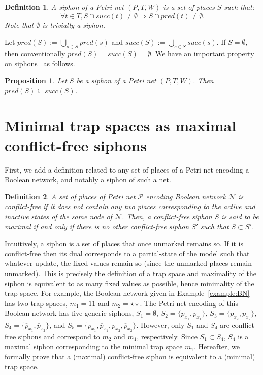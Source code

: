 \documentclass[preprint,12pt]{elsarticle}
\newtheorem{definition}{Definition}[section]
\newtheorem{proposition}{Proposition}[section]
\begin{document}
\begin{definition}

  A \emph{siphon} of a Petri net \((P, T, W)\) is a set of places \(S\) such that:
  \[\forall t\in T, S\cap succ(t)\not =\emptyset\Rightarrow S\cap pred(t)\not =\emptyset.\]
  Note that \(\emptyset\) is trivially a siphon.

\end{definition}

Let \(pred(S) := \bigcup_{s \in S}pred(s)\) and \(succ(S) := \bigcup_{s \in S}succ(s)\).
If \(S = \emptyset\), then conventionally \(pred(S) = succ(S) = \emptyset\).
We have an important property on siphons~\cite{DBLP:journals/isci/LiuB16} as follows.

\begin{proposition}
\label{prop:siphon_set}
  Let \(S\) be a siphon of a Petri net \((P, T, W)\).
  Then \(pred(S) \subseteq succ(S)\).

\end{proposition}


\section{Minimal trap spaces as maximal conflict-free siphons}
\label{sec:Main_finding}

First, we add a definition related to any set of places of a Petri net encoding a Boolean network, and notably a siphon of such a net.

\begin{definition}

  A set of places of Petri net \(\mathcal{P}\) encoding Boolean network \(\mathcal{N}\) is \emph{conflict-free} if it does not contain any two places corresponding to the active and inactive states of the same \emph{node} of \(\mathcal{N}\).
  Then, a conflict-free siphon \(S\) is said to be \emph{maximal} if and only if there is no other conflict-free siphon \(S'\) such that \(S \subset S'\).

\end{definition}

Intuitively, a siphon is a set of places that once unmarked remains so.
If it is conflict-free then its dual corresponds to a partial-state of the model such that whatever update, the fixed values remain so (since the unmarked places remain unmarked).
This is precisely the definition of a trap space and maximality of the siphon is equivalent to as many fixed values as possible, hence minimality of the trap space.
For example, the Boolean network given in Example~\ref{example:BN} has two trap spaces, \(m_1 = 11\) and \(m_2 = \star\star\).
The Petri net encoding of this Boolean network has five generic siphons, \(S_1 = \emptyset\), \(S_2 = \{p_{x_1}, \overline{p}_{x_1}\}\), \(S_3 = \{p_{x_2}, \overline{p}_{x_2}\}\), \(S_4 = \{\overline{p}_{x_1}, \overline{p}_{x_2}\}\), and \(S_5 = \{p_{x_1}, \overline{p}_{x_1}, p_{x_2}, \overline{p}_{x_2}\}\).
However, only \(S_1\) and \(S_4\) are conflict-free siphons and correspond to \(m_2\) and \(m_1\), respectively.
Since \(S_1 \subset S_4\), \(S_4\) is a maximal siphon corresponding to the minimal trap space \(m_1\).
Hereafter, we formally prove that a (maximal) conflict-free siphon is equivalent to a (minimal) trap space.
\end{document}

